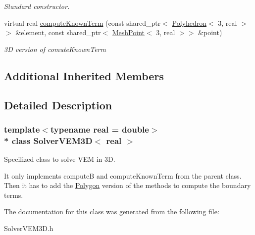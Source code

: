 \begin{DoxyCompactItemize}
\begin{DoxyCompactList}\small\item\em Standard constructor. \end{DoxyCompactList}\item 
virtual real \hyperlink{class_solver_v_e_m3_d_ae11471f960f7c4677778dd52d8ce1bd5}{compute\+Known\+Term} (const shared\+\_\+ptr$<$ \hyperlink{class_polyhedron}{Polyhedron}$<$ 3, real $>$$>$ \&element, const shared\+\_\+ptr$<$ \hyperlink{class_mesh_point}{Mesh\+Point}$<$ 3, real $>$$>$ \&point)\hypertarget{class_solver_v_e_m3_d_ae11471f960f7c4677778dd52d8ce1bd5}{}\label{class_solver_v_e_m3_d_ae11471f960f7c4677778dd52d8ce1bd5}

\begin{DoxyCompactList}\small\item\em 3D version of comute\+Known\+Term \end{DoxyCompactList}\end{DoxyCompactItemize}
\subsection*{Additional Inherited Members}


\subsection{Detailed Description}
\subsubsection*{template$<$typename real = double$>$\\*
class Solver\+V\+E\+M3\+D$<$ real $>$}

Specilized class to solve V\+EM in 3D. 

It only implements computeB and compute\+Known\+Term from the parent class. Then it has to add the \hyperlink{class_polygon}{Polygon} version of the methods to compute the boundary terms. 

The documentation for this class was generated from the following file\+:\begin{DoxyCompactItemize}
\item 
Solver\+V\+E\+M3\+D.\+h\end{DoxyCompactItemize}
